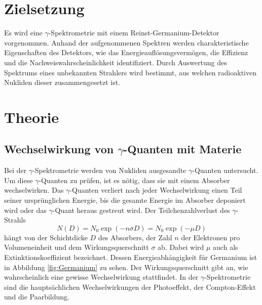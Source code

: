 \section{Zielsetzung}
\label{sec:Zielsetzung}
Es wird eine $\gamma$-Spektrometrie mit einem Reinst-Germanium-Detektor vorgenommen.
Anhand der aufgenommenen Spektren werden charakteristische Eigenschaften des Detektors, wie das Energieauflösungsvermögen, die Effizienz und die Nachweiswahrscheinlichkeit identifiziert.
Durch Auswertung des Spektrums eines unbekannten Strahlers wird bestimmt, aus welchen radioaktiven Nukliden dieser zusammengesetzt ist.

\section{Theorie}
\label{sec:Theorie}

\subsection{Wechselwirkung von \texorpdfstring{$\gamma$}{gamma}-Quanten mit Materie}
Bei der $\gamma$-Spektrometrie werden von Nukliden ausgesandte $\gamma$-Quanten untersucht.
Um diese $\gamma$-Quanten zu prüfen, ist es nötig, dass sie mit einem Absorber wechselwirken.
Das $\gamma$-Quanten verliert nach jeder Wechselwirkung einen Teil seiner ursprünglichen Energie, bis die gesamte Energie im Absorber deponiert wird oder das $\gamma$-Quant heraus gestreut wird.
Der Teilchenzahlverlust des $\gamma$-Strahls
\begin{equation}
  \label{eq:Absorbtion}
  N(D)=N_0\exp(-n\sigma D)=N_0\exp(-\mu D)
\end{equation}
hängt von der Schichtdicke $D$ des Absorbers, der Zahl $n$ der Elektronen pro Volumeneinheit und dem Wirkungsquerschnitt $\sigma$ ab. 
Dabei wird $\mu$ auch als Extinktionskoeffizient bezeichnet. Dessen Energieabhängigkeit für Germanium ist in Abbildung \ref{fig:Germanium} zu sehen.
Der Wirkungsquerschnitt gibt an, wie wahrscheinlich eine gewisse Wechselwirkung stattfindet.
In der $\gamma$-Spektrometrie sind die hauptsächlichen Wechselwirkungen der Photoeffekt, der Compton-Effekt und die Paarbildung.

